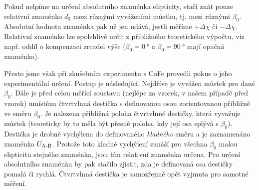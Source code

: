 Pokud nelpíme na určení absolutního znaménka elipticity, stačí znát pouze relativní znaménko $d_3$ mezi různými vyváženími můstku, tj. mezi různými $\beta_0$.
Absolutní hodnota znaménka pak už jen udává, jestli měříme $+\Delta\chi$ či $-\Delta\chi$.
Relativní znaménko lze spolehlivě určit z přibližného teoretického výpočtu, viz např. oddíl o kompenzaci zrcadel výše ($\beta_0=\SI{0}{\degree}$ a $\beta_0=\SI{90}{\degree}$ mají opačná znaménka).

Přesto jsme však při zkušebním experimentu s CoFe provedli pokus o jeho experimentální určení.
Postup je následující.
Nejdříve je vyvážen můstek pro dané $\beta_0$.
Dále je před celou měřící soustavu (nejlépe za vzorek, v našem případě před vzorek) umístěna čtvrtvlnná destička s definovanou osou zorientovanou přibližně ve směru $\beta_0$.
Je nalezena přibližná poloha čtvrtvlnné destičky, která vyvažuje můstek (teoreticky by to měla být přesně poloha, kdy její osa splývá s $\beta_0$).
Destička je drobně vychýlena do definovaného \emph{kladného} směru a je zaznamenáno znaménko $U_\textrm{A-B}$.
Protože toto kladné vychýlení zanáší pro všechna $\beta_0$ malou elipticitu stejného znaménka, jsou tím relativní znaménka určena.
Pro určení absolutního znaménka by pak stačilo zjistit, zda je definovaná osa destičky pomalá či rychlá.
Čtvrtvlnná destička je samozřejmě opět vyjmuta pro samotné měření.

